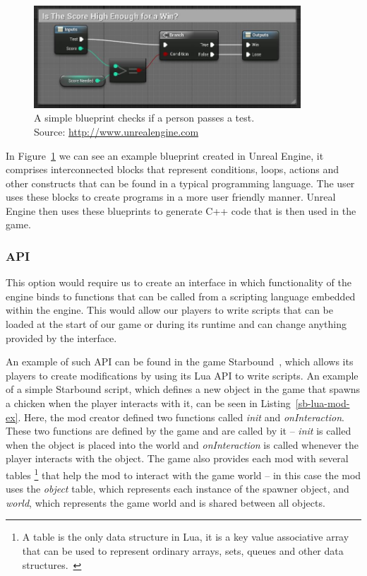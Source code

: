 \begin{figure}[h]
    \centering
    \includegraphics[width=10cm]{../img/blueprints.jpg}
    \caption{A simple blueprint checks if a person passes a test.
             \\Source: \href{://docs.unrealengine.com/latest/images/Engine/Blueprints/UserGuide/Macros/score\_comparison\_example\_macro.jpg}
             {http://www.unrealengine.com}}
    \label{ue-blueprints}
\end{figure}

In Figure~\ref{ue-blueprints} we can see an example blueprint created in Unreal Engine, it comprises interconnected blocks that represent
conditions, loops, actions and other constructs that can be found in a typical programming language. The user uses these blocks to
create programs in a more user friendly manner. Unreal Engine then uses these blueprints to generate C++ code that is then used in the game.

\subsubsection{API}

This option would require us to create an interface in which functionality of the engine binds to functions that can be called
from a scripting language embedded within the engine. This would allow our players to write scripts that can be loaded at the
start of our game or during its runtime and can change anything provided by the interface.

An example of such API can be found in the game Starbound~\cite{Starbound}, which allows its
players to create modifications by using its Lua API to write scripts. An example of a simple Starbound script,
which defines a new object in the game that spawns a chicken when the player interacts with it,
can be seen in Listing~\ref{sb-lua-mod-ex}. Here, the mod creator defined two functions called \emph{init} and
\emph{onInteraction}. These two functions are defined by the game and are called by it
-- \emph{init} is called when the object is placed into the world and \emph{onInteraction} is called
whenever the player interacts with the object. The game also provides each mod with several tables
\footnote{A table is the only data structure in Lua, it is a key value associative array that can be used to represent
ordinary arrays, sets, queues and other data structures.~\cite{PIL}}
that help the mod to interact with the game world -- in this case the mod uses the \emph{object} table, which
represents each instance of the spawner object, and \emph{world}, which represents the game world and
is shared between all objects.

